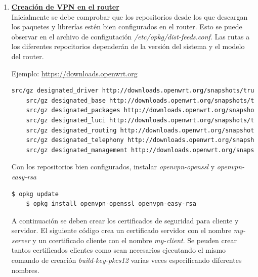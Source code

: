 \documentclass[12pt, twoside]{article}
\begin{document}
            \begin{enumerate}
                \item \textbf{\underline{Creación de VPN en el router}} \\
                    Inicialmente se debe comprobar que los repositorios desde los que descargan los paquetes y librerías estén bien configurados en el router. Esto se puede observar en el archivo de configutación \textit{/etc/opkg/dist-feeds.conf}. Las rutas a los diferentes repocitorios dependerán de la versión del sistema y el modelo del router.

                    Ejemplo:
                    \url{https://downloads.openwrt.org}

                    \begin{lstlisting}[language=bash]
    src/gz designated_driver http://downloads.openwrt.org/snapshots/trunk/brcm63xx/smp/packages/packages
    src/gz designated_base http://downloads.openwrt.org/snapshots/trunk/brcm63xx/smp/packages/base
    src/gz designated_packages http://downloads.openwrt.org/snapshots/trunk/brcm63xx/smp/packages/packages
    src/gz designated_luci http://downloads.openwrt.org/snapshots/trunk/brcm63xx/smp/packages/luci
    src/gz designated_routing http://downloads.openwrt.org/snapshots/trunk/brcm63xx/smp/packages/routing
    src/gz designated_telephony http://downloads.openwrt.org/snapshots/trunk/brcm63xx/smp/packages/telephony
    src/gz designated_management http://downloads.openwrt.org/snapshots/trunk/brcm63xx/smp/packages/management
                    \end{lstlisting}
                    
                    Con los repositorios bien configurados, instalar \textit{openvpn-openssl} y \textit{openvpn-easy-rsa}
                    
                    \begin{lstlisting}[language=bash]
    $ opkg update
    $ opkg install openvpn-openssl openvpn-easy-rsa
                    \end{lstlisting}

                    A continuación se deben crear los certificados de seguridad para cliente y servidor. El siguiente código crea un certificado servidor con el nombre \textit{my-server} y un ccertificado cliente con el nombre \textit{my-client}. Se peuden crear tantos certificados clientes como sean necesarios ejecutando el mismo comando de creación \textit{build-key-pkcs12} varias veces especificando diferentes nombres.


\end{enumerate}
\end{document}
